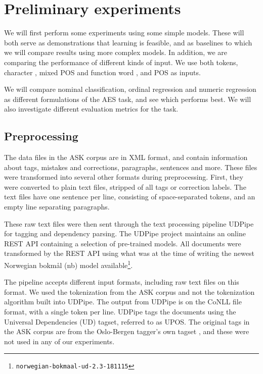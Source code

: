 \chapter{Preliminary experiments} \label{ch:baseline}

We will first perform some experiments using some simple models. These will
both serve as demonstrations that learning is feasible, and as baselines to
which we will compare results using more complex models. In addition, we are
comparing the performance of different kinds of input. We use both tokens,
character \ngrams, mixed POS and function word \ngrams, and \ac{POS} \ngrams
as inputs.

We will compare nominal classification, ordinal regression and numeric
regression as different formulations of the \ac{AES} task, and see which
performs best. We will also investigate different evaluation metrics for the
task.


\section{Preprocessing}

The data files in the ASK corpus are in \ac{XML} format, and contain
information about tags, mistakes and corrections, paragraphs, sentences and
more. These files were transformed into several other formats during
preprocessing. First, they were converted to plain text files, stripped of
all tags or correction labels. The text files have one sentence per line,
consisting of space-separated tokens, and an empty line separating
paragraphs.

These raw text files were then sent through the text processing pipeline
UDPipe \autocite{udpipe:2017} for tagging and dependency parsing. The UDPipe
project maintains an online REST \ac{API} containing a selection of
pre-trained models. All documents were transformed by the REST \ac{API} using
what was at the time of writing the newest Norwegian bokmål (nb) model
available\footnote{\texttt{norwegian-bokmaal-ud-2.3-181115}}.

The pipeline accepts different input formats, including raw text files on
this format. We used the tokenization from the ASK corpus and not the
tokenization algorithm built into UDPipe. The output from UDPipe is on the
CoNLL file format, with a single token per line. UDPipe tags the documents
using the Universal Dependencies (UD) tagset, referred to as UPOS. The
original tags in the ASK corpus are from the Oslo-Bergen tagger's own tagset
\autocite{oslobergen}, and these were not used in any of our experiments.


